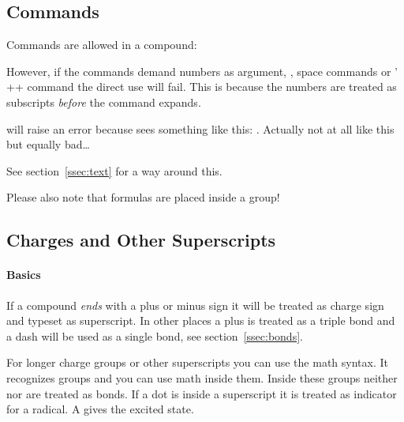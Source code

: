\documentclass[load-preamble+]{cnltx-doc}
\begin{document}
\subsection{Commands}
Commands are allowed in a compound:
\begin{example}
   
\end{example}

However, if the commands demand numbers as argument, \eg, space commands or
\chemmacros' \verbcode+\ox+ command the direct use will fail.  This is
because the numbers are treated as subscripts \emph{before} the command
expands.
\begin{sourcecode}
   will raise an error because \hspace sees something like
  this: \hspace{$_2$mm}. Actually not at all like this but equally bad\ldots
\end{sourcecode}
See section~\ref{ssec:text} for a way around this.

Please also note that formulas are placed inside a group!
\begin{example}
\end{example}

\subsection{Charges and Other Superscripts}
\paragraph{Basics}
If a compound \emph{ends} with a plus or minus sign it will be treated as
charge sign and typeset as superscript.  In other places a plus is treated as
a triple bond and a dash will be used as a single bond, see
section~\ref{ssec:bonds}.
\begin{example}
    \par
   
\end{example}

For longer charge groups or other superscripts you can use the math syntax.
It recognizes groups and you can use math inside them.  Inside these groups
neither \code{+} nor \code{-} are treated as bonds.  If a dot  is
inside a superscript it is treated as indicator for a radical.  A \code{*}
gives the excited state.
\begin{example}
   \par
   \par
   \par
   \par
   \par
   \par
   \par
   \par
\end{example}
\end{document}
